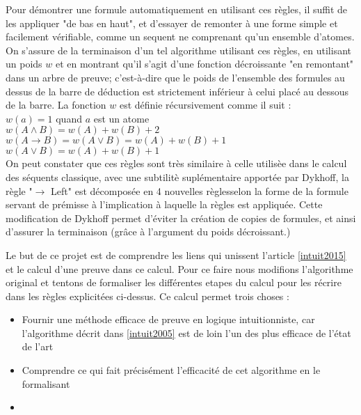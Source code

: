 Pour d\'emontrer une formule automatiquement en utilisant ces r\`egles, il suffit de les appliquer "de bas en haut", et d'essayer de remonter \`a une forme simple et facilement v\'erifiable, comme un sequent ne comprenant qu'un ensemble d'atomes.
On s'assure de la terminaison d'un tel algorithme utilisant ces r\`egles, en utilisant un poids $w$ et en montrant qu'il s'agit d'une fonction d\'ecroissante "en remontant" dans un arbre de preuve; c'est-\`a-dire que le poids de l'ensemble des formules au dessus de la barre de d\'eduction est strictement inférieur à celui plac\'e au dessous de la barre. La fonction $w$ est d\'efinie r\'ecursivement comme il suit : \\
$w(a) = 1$ quand $a$ est un atome \\
$w(A \land B) = w(A) + w(B) + 2 $ \\
$w(A \to B ) = w(A \lor B) = w(A) + w(B) + 1$\\
$w(A \lor B) = w(A) + w(B) + 1$\\

On peut constater que ces r\`egles sont tr\`es similaire \`a celle utilis\`ee dans le calcul des s\'equents classique, avec une subtilit\`e supl\'ementaire apport\'ee par Dykhoff, la r\`egle "$\to$ Left" est d\'ecompos\'ee en 4 nouvelles r\`eglesselon la forme de la formule servant de pr\'emisse à l'implication à laquelle la r\`egles est appliqu\'ee. Cette modification de Dykhoff permet d'\'eviter la cr\'eation de copies de formules, et ainsi d'assurer la terminaison (gr\^ace \`a l'argument du poids d\'ecroissant.)

Le but de ce projet est de comprendre les liens qui unissent l'article \ref{intuit2015} et le calcul d'une preuve dans ce calcul. Pour ce faire nous modifions l'algorithme original et tentons de formaliser les diff\'erentes etapes du calcul pour les r\'ecrire dans les r\`egles explicit\'ees ci-dessus. Ce calcul permet trois choses :

\begin{itemize}
\item Fournir une m\'ethode efficace de preuve en logique intuitionniste, car l'algorithme d\'ecrit dans \ref{intuit2005} est de loin l'un des plus efficace de l'\'etat de l'art
\item Comprendre ce qui fait pr\'ecis\'ement l'efficacit\'e de cet algorithme en le formalisant
\item [TROUVER UNE TROISIEME RAISON]
\end{itemize}
